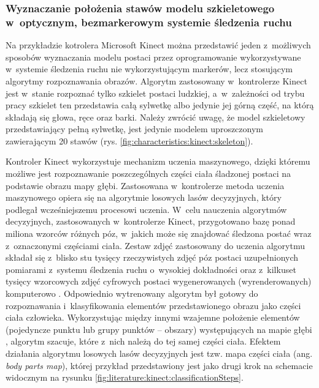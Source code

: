 \subsubsection*{Wyznaczanie położenia stawów modelu szkieletowego w~optycznym, bezmarkerowym systemie śledzenia ruchu}\label{chap:humanModel:kinect}
Na przykładzie kotrolera Microsoft Kinect można przedstawić jeden z~możliwych sposobów wyznaczania modelu postaci 
przez oprogramowanie wykorzystywane w~systemie śledzenia ruchu nie wykorzystującym markerów, lecz stosującym algorytmy rozpoznawania obrazów. Algorytm zastosowany w~kontrolerze Kinect jest w~stanie rozpoznać tylko szkielet postaci ludzkiej, a~w~zależności od trybu pracy szkielet ten przedstawia całą sylwetkę albo jedynie jej górną część, na którą składają się głowa, ręce oraz barki. Należy zwrócić uwagę, że model szkieletowy przedstawiający pełną sylwetkę, jest jedynie modelem uproszczonym zawierającym 20 stawów (rys. \ref{fig:characteristics:kinect:skeleton}).
		
Kontroler Kinect wykorzystuje mechanizm uczenia maszynowego, dzięki któremu możliwe jest rozpoznawanie poszczególnych części ciała śladzonej postaci na podstawie obrazu mapy głębi. Zastosowana w~kontrolerze metoda uczenia maszynowego opiera się na algorytmie losowych lasów decyzyjnych\cite{Criminisi2011}, który podlegał wcześniejszemu procesowi uczenia. W~celu nauczenia algorytmów decyzyjnych, zastosowanych w~kontrolerze Kinect, przygotowano bazę ponad miliona wzorców różnych póz, w~jakich może się znajdować śledzona postać wraz z~oznaczonymi częściami ciała. Zestaw zdjęć zastosowany do uczenia algorytmu składał się z~blisko stu tysięcy rzeczywistych zdjęć póz postaci uzupełnionych pomiarami z~systemu śledzenia ruchu o~wysokiej dokładności oraz z~kilkuset tysięcy wzorcowych zdjęć cyfrowych postaci wygenerowanych (wyrenderowanych) komputerowo . Odpowiednio wytrenowany algorytm był gotowy do rozpoznawania i~klasyfikowania elementów przedstawionego obrazu jako części ciała człowieka. Wykorzystując między innymi wzajemne położenie elementów (pojedyncze punktu lub grupy punktów -- obszary) występujących na mapie głębi 
, algorytm szacuje, które z~nich należą do tej samej części ciała. Efektem działania algorytmu losowych lasów decyzyjnych jest tzw. mapa części ciała (ang. \emph{body parts map}), której przykład przedstawiony jest jako drugi krok na schemacie widocznym na rysunku \ref{fig:literature:kinect:classificationSteps}.
		
